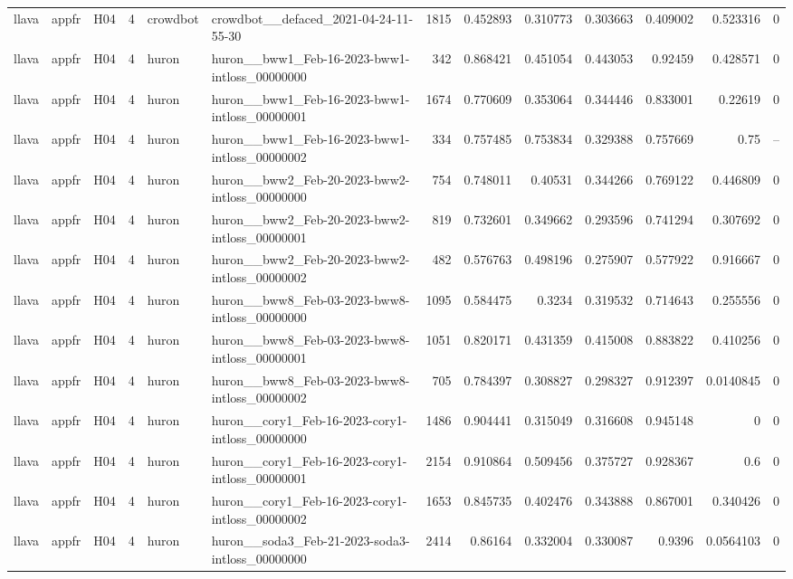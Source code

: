 \begin{longtable}{lllrllrrrrrrr}
llava & appfr & H04 & 4 & crowdbot & crowdbot\_\_defaced\_2021-04-24-11-55-30 & 1815 & 0.452893 & 0.310773 & 0.303663 & 0.409002 & 0.523316 & 0 \\
llava & appfr & H04 & 4 & huron & huron\_\_bww1\_Feb-16-2023-bww1-intloss\_00000000 & 342 & 0.868421 & 0.451054 & 0.443053 & 0.92459 & 0.428571 & 0 \\
llava & appfr & H04 & 4 & huron & huron\_\_bww1\_Feb-16-2023-bww1-intloss\_00000001 & 1674 & 0.770609 & 0.353064 & 0.344446 & 0.833001 & 0.22619 & 0 \\
llava & appfr & H04 & 4 & huron & huron\_\_bww1\_Feb-16-2023-bww1-intloss\_00000002 & 334 & 0.757485 & 0.753834 & 0.329388 & 0.757669 & 0.75 & -- \\
llava & appfr & H04 & 4 & huron & huron\_\_bww2\_Feb-20-2023-bww2-intloss\_00000000 & 754 & 0.748011 & 0.40531 & 0.344266 & 0.769122 & 0.446809 & 0 \\
llava & appfr & H04 & 4 & huron & huron\_\_bww2\_Feb-20-2023-bww2-intloss\_00000001 & 819 & 0.732601 & 0.349662 & 0.293596 & 0.741294 & 0.307692 & 0 \\
llava & appfr & H04 & 4 & huron & huron\_\_bww2\_Feb-20-2023-bww2-intloss\_00000002 & 482 & 0.576763 & 0.498196 & 0.275907 & 0.577922 & 0.916667 & 0 \\
llava & appfr & H04 & 4 & huron & huron\_\_bww8\_Feb-03-2023-bww8-intloss\_00000000 & 1095 & 0.584475 & 0.3234 & 0.319532 & 0.714643 & 0.255556 & 0 \\
llava & appfr & H04 & 4 & huron & huron\_\_bww8\_Feb-03-2023-bww8-intloss\_00000001 & 1051 & 0.820171 & 0.431359 & 0.415008 & 0.883822 & 0.410256 & 0 \\
llava & appfr & H04 & 4 & huron & huron\_\_bww8\_Feb-03-2023-bww8-intloss\_00000002 & 705 & 0.784397 & 0.308827 & 0.298327 & 0.912397 & 0.0140845 & 0 \\
llava & appfr & H04 & 4 & huron & huron\_\_cory1\_Feb-16-2023-cory1-intloss\_00000000 & 1486 & 0.904441 & 0.315049 & 0.316608 & 0.945148 & 0 & 0 \\
llava & appfr & H04 & 4 & huron & huron\_\_cory1\_Feb-16-2023-cory1-intloss\_00000001 & 2154 & 0.910864 & 0.509456 & 0.375727 & 0.928367 & 0.6 & 0 \\
llava & appfr & H04 & 4 & huron & huron\_\_cory1\_Feb-16-2023-cory1-intloss\_00000002 & 1653 & 0.845735 & 0.402476 & 0.343888 & 0.867001 & 0.340426 & 0 \\
llava & appfr & H04 & 4 & huron & huron\_\_soda3\_Feb-21-2023-soda3-intloss\_00000000 & 2414 & 0.86164 & 0.332004 & 0.330087 & 0.9396 & 0.0564103 & 0 \\

\end{longtable}
